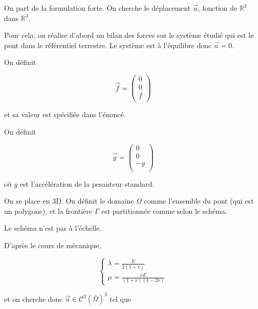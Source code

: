On part de la formulation forte. On cherche le déplacement $\vec{u}$, fonction de $\mathbb{R}^3$ dans $\mathbb{R}^3$.

Pour cela, on réalise d'abord un bilan des forces sur le système étudié qui est le pont dans le référentiel terrestre. Le système est à l'équilibre donc $\vec{a} = 0$.

On définit

\begin{equation}
    \vec{f} = \begin{pmatrix} 0\\ 0\\ f\\\end{pmatrix}
\end{equation}

et sa valeur est spécifiée dans l'énoncé.

On définit 

\begin{equation}
    \vec{g} = \begin{pmatrix} 0\\ 0\\ -g\\\end{pmatrix}
\end{equation}

où $g$ est l'accélération de la pesanteur standard.

On se place en 3D. On définit le domaine $\Omega$ comme l'ensemble du pont (qui est un polygone), et la frontière $\Gamma$ est partitionnée comme selon le schéma.

Le schéma n'est pas à l'échelle.

D'après le cours de mécanique,

\begin{equation}
    \begin{cases}
        \lambda = \frac{E}{2(1+\nu)}\\
        \mu = \frac{\nu E}{(1+\nu)(1-2\nu)}
    \end{cases}
\end{equation}

et on cherche donc $\vec{u} \in \mathcal{C}^2(\bar{\Omega})^3$ tel que

